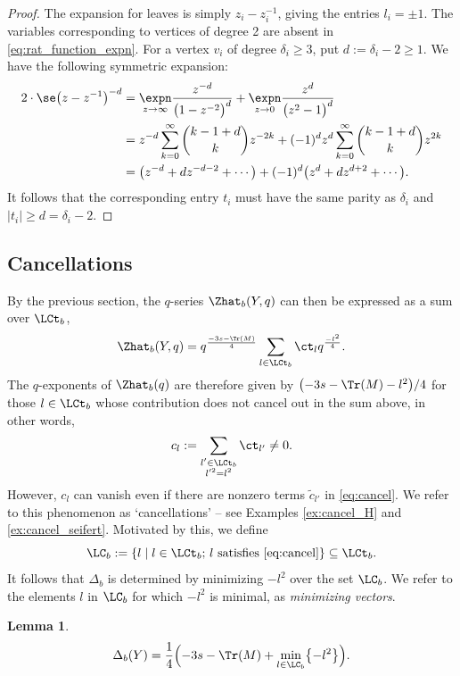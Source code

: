 \documentclass[10pt,a4paper]{amsart}
\newcounter{theorem}
\newtheorem{Lemma}[Theorem]{Lemma}
\begin{document}
\begin{proof}
 The expansion for leaves is simply $z_i-z_i^{-1}$, giving the entries $l_i = \pm 1$. The variables corresponding to vertices of degree 2 are absent in \eqref{eq:rat_function_expn}. For a vertex $v_i$ of degree $\delta_{i} \geq 3$, put $d := \delta_{i}-2 \geq 1$. We have the following symmetric expansion:
 \begin{align*}
 2 \cdot \se \bigl(z-z^{-1}\bigr)^{-d} &{}=
 \underset{z \to \infty}{\expn} \frac{z^{-d}}{\bigl(1-z^{-2}\bigr)^{d}}
 + \underset{z \to 0}{\expn} \frac{z^{d}}{\bigl(z^2-1\bigr)^{d}}\\
 &{}=
 z^{-d} \sum_{k=0}^\infty \binom{k-1+d}{k}z^{-2k} + (-1)^d z^{d} \sum_{k=0}^\infty \binom{k-1+d}{k} z^{2k}\\
 &{}=
 \bigl(z^{-d} + d z^{-d-2} + \cdots\bigr) + (-1)^{d} \bigl(z^{d} + d z^{d+2} +\cdots\bigr).
 \end{align*}
 It follows that the corresponding entry $t_i$ must have the same parity as $\delta_i$ and $\lvert t_i \rvert \geq d = \delta_i-2$.
\end{proof}

\subsection{Cancellations}\label{ss:cancel}

By the previous section, the $q$-series $\Zhat_b(Y,q)$ can then be expressed as a sum over $\LCt_b$,
\begin{equation*}%
 \Zhat_b(Y,q) = q^{\frac{-3s - \Tr(M)}{4}} \sum_{l \in \LCt_b} \ct_l q^{\frac{-l^2}{4}}.
\end{equation*}
The $q$-exponents of $\Zhat_b(q)$ are therefore given by
$\bigl( -3s - \Tr(M) -l^2\bigr)/4$ for those $l \in \LCt_b$ whose contribution does not cancel out in the sum above, in other words,
\begin{equation}\label{eq:cancel}
 c_l:= \sum_{\substack{l' \in \LCt_b\\l'^2 = l^2}} \ct_{l'} \neq 0.
\end{equation}
However, $c_l$ can vanish even if there are nonzero terms $\tilde{c}_{l'}$ in \eqref{eq:cancel}. We refer to this phenomenon as `cancellations' -- see Examples \ref{ex:cancel_H} and \ref{ex:cancel_seifert}.
Motivated by this, we define
\[
 \LC_b := \{l \mid l \in \LCt_b;\, l \text{ satisfies \eqref{eq:cancel}} \} \subseteq \LCt_b.
\]
It follows that $\Delta_b$ is determined by minimizing $-l^2$ over the set $\LC_b$. We refer to the elements $l$ in $\LC_b$ for which $-l^2$ is minimal, as \emph{minimizing vectors}.
\begin{Lemma}\label{lm:delta_minimizer}
 \begin{equation*}
 \Delta_b(Y) = \frac14 \Bigl(-3s - \Tr(M) + \min_{l \in \LC_b} \bigl\{ -l^2 \bigr\}\Bigr).
 \end{equation*}
\end{Lemma}
\end{document}

